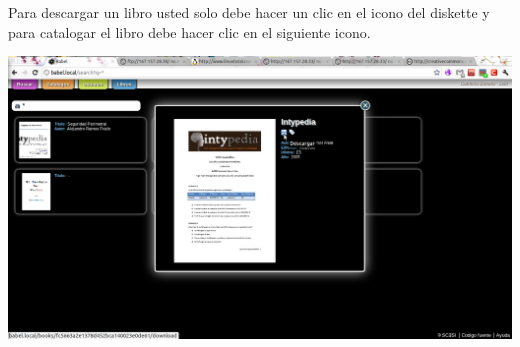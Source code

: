 \documentclass[12pt,letterpaper,oneside]{book}
\begin{document}
Para descargar un libro usted solo debe hacer un clic en el icono del diskette y para catalogar el libro debe hacer clic en el siguiente icono.
\begin{center}
\includegraphics[scale=0.36]{img/3.png}
\end{center}
\pagebreak
\end{document}
